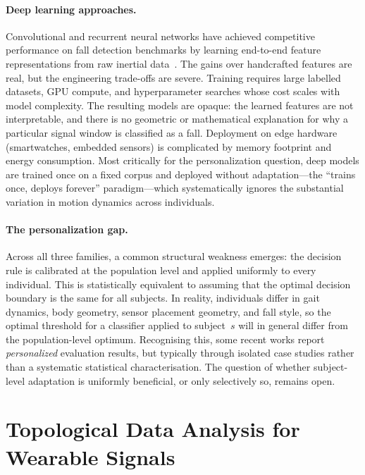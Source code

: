 \documentclass[onluarkali,ingilizce,yukseklisans,karton,LisansustuEgitim]{itutez}
\providecommand{\1}{\mathbf{1}}
\begin{document}
\paragraph{Deep learning approaches.}
Convolutional and recurrent neural networks have achieved competitive performance on
fall detection benchmarks by learning end-to-end feature representations from raw
inertial data~\parencite{batchuluun2022deep, wang2020falldl}.  The gains over handcrafted
features are real, but the engineering trade-offs are severe.  Training requires large
labelled datasets, GPU compute, and hyperparameter searches whose cost scales with
model complexity.  The resulting models are opaque: the learned features are not
interpretable, and there is no geometric or mathematical explanation for why a
particular signal window is classified as a fall.  Deployment on edge hardware
(smartwatches, embedded sensors) is complicated by memory footprint and energy
consumption.  Most critically for the personalization question, deep models are
trained once on a fixed corpus and deployed without adaptation---the ``trains once,
deploys forever'' paradigm---which systematically ignores the substantial variation
in motion dynamics across individuals.

\paragraph{The personalization gap.}
Across all three families, a common structural weakness emerges: the decision rule is
calibrated at the population level and applied uniformly to every individual.  This
is statistically equivalent to assuming that the optimal decision boundary is the
same for all subjects.  In reality, individuals differ in gait dynamics, body geometry,
sensor placement geometry, and fall style, so the optimal threshold for a classifier
applied to subject~$s$ will in general differ from the population-level optimum.
Recognising this, some recent works report \emph{personalized} evaluation results, but
typically through isolated case studies rather than a systematic statistical
characterisation.  The question of whether subject-level adaptation is uniformly
beneficial, or only selectively so, remains open.

\section{Topological Data Analysis for Wearable Signals}
\label{subsec:tda-motivation}
\end{document}
